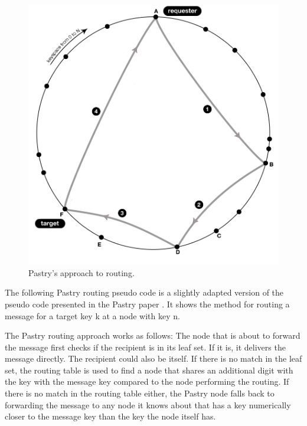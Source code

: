 \begin{figure}[!htb]
\begin{center}
	\includegraphics[width=0.9\linewidth]{illustrations/PastryRoutingSuccess.png}
  \caption{Pastry's approach to routing.}
  \label{figRoutingPastry}
\end{center}
\end{figure}

The following Pastry routing pseudo code is a slightly adapted version of the pseudo code presented in the Pastry paper \cite{pastry}.
It shows the method for routing a message for a target key k at a node with key n.

The Pastry routing approach works as follows: The node that is about to forward the message first checks if the recipient is in its leaf set. If it is, it delivers the message directly. The recipient could also be itself.
If there is no match in the leaf set, the routing table is used to find a node that shares an additional digit with the key with the message key compared to the node performing the routing. If there is no match in the routing table either, the Pastry node falls back to forwarding the message to any node it knows about that has a key numerically closer to the message key than the key the node itself has.



